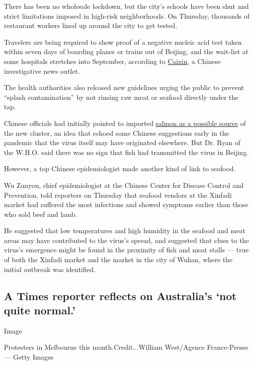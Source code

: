 There has been no wholesale lockdown, but the city's schools have been
shut and strict limitations imposed in high-risk neighborhoods. On
Thursday, thousands of restaurant workers lined up around the city to
get tested.

Travelers are being required to show proof of a negative nucleic acid
test taken within seven days of boarding planes or trains out of
Beijing, and the wait-list at some hospitals stretches into September,
according to
\href{http://china.caixin.com/2020-06-18/101568962.html?cxw=IOS\&Sfrom=Wechat\&originReferrer=iOSshare}{Caixin},
a Chinese investigative news outlet.

The health authorities also released new guidelines urging the public to
prevent ``splash contamination'' by not rinsing raw meat or seafood
directly under the tap.

Chinese officials had initially pointed to imported
\href{https://www.nytimes.com/2020/06/18/world/asia/coronavirus-china-salmon.html}{salmon
as a possible source} of the new cluster, an idea that echoed some
Chinese suggestions early in the pandemic that the virus itself may have
originated elsewhere. But Dr. Ryan of the W.H.O. said there was no sign
that fish had transmitted the virus in Beijing.

However, a top Chinese epidemiologist made another kind of link to
seafood.

Wu Zunyou, chief epidemiologist at the Chinese Center for Disease
Control and Prevention, told reporters on Thursday that seafood vendors
at the Xinfadi market had suffered the most infections and showed
symptoms earlier than those who sold beef and lamb.

He suggested that low temperatures and high humidity in the seafood and
meat areas may have contributed to the virus's spread, and suggested
that clues to the virus's emergence might be found in the proximity of
fish and meat stalls --- true of both the Xinfadi market and the market
in the city of Wuhan, where the initial outbreak was identified.

\hypertarget{a-times-reporter-reflects-on-australias-not-quite-normal}{%
\subsection{A Times reporter reflects on Australia's `not quite
normal.'}\label{a-times-reporter-reflects-on-australias-not-quite-normal}}

Image

Protesters in Melbourne this month.Credit...William West/Agence
France-Presse --- Getty Images

